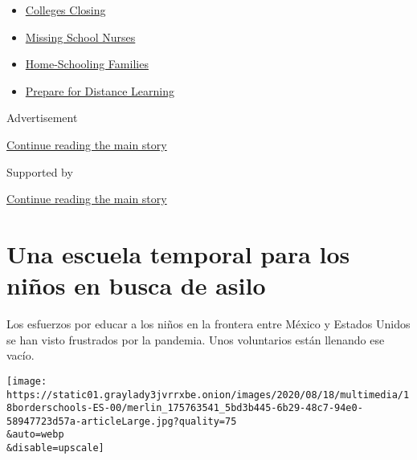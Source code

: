 \begin{itemize}
\tightlist
\item
  \href{https://www.nytimes3xbfgragh.onion/2020/08/19/us/colleges-closing-covid.html?name=styln-coronavirus-schools-reopening\&region=TOP_BANNER\&variant=undefined\&block=storyline_menu_recirc\&action=click\&pgtype=Article\&impression_id=6c72b101-e386-11ea-ba56-c354277706d3}{Colleges
  Closing}
\item
  \href{https://www.nytimes3xbfgragh.onion/2020/08/20/us/schools-reopening-nurses-covid.html?name=styln-coronavirus-schools-reopening\&region=TOP_BANNER\&variant=undefined\&block=storyline_menu_recirc\&action=click\&pgtype=Article\&impression_id=6c72b102-e386-11ea-ba56-c354277706d3}{Missing
  School Nurses}
\item
  \href{https://www.nytimes3xbfgragh.onion/2020/08/18/parenting/homeschool-families.html?name=styln-coronavirus-schools-reopening\&region=TOP_BANNER\&variant=undefined\&block=storyline_menu_recirc\&action=click\&pgtype=Article\&impression_id=6c72b103-e386-11ea-ba56-c354277706d3}{Home-Schooling
  Families}
\item
  \href{https://www.nytimes3xbfgragh.onion/2020/08/05/parenting/parents-distance-learning.html?name=styln-coronavirus-schools-reopening\&region=TOP_BANNER\&variant=undefined\&block=storyline_menu_recirc\&action=click\&pgtype=Article\&impression_id=6c72d810-e386-11ea-ba56-c354277706d3}{Prepare
  for Distance Learning}
\end{itemize}

Advertisement

\protect\hyperlink{after-top}{Continue reading the main story}

Supported by

\protect\hyperlink{after-sponsor}{Continue reading the main story}

\hypertarget{una-escuela-temporal-para-los-niuxf1os-en-busca-de-asilo}{%
\section{Una escuela temporal para los niños en busca de
asilo}\label{una-escuela-temporal-para-los-niuxf1os-en-busca-de-asilo}}

Los esfuerzos por educar a los niños en la frontera entre México y
Estados Unidos se han visto frustrados por la pandemia. Unos voluntarios
están llenando ese vacío.

\texttt{[image: https://static01.graylady3jvrrxbe.onion/images/2020/08/18/multimedia/18borderschools-ES-00/merlin\_175763541\_5bd3b445-6b29-48c7-94e0-58947723d57a-articleLarge.jpg?quality=75\\\&auto=webp\\\&disable=upscale]}

